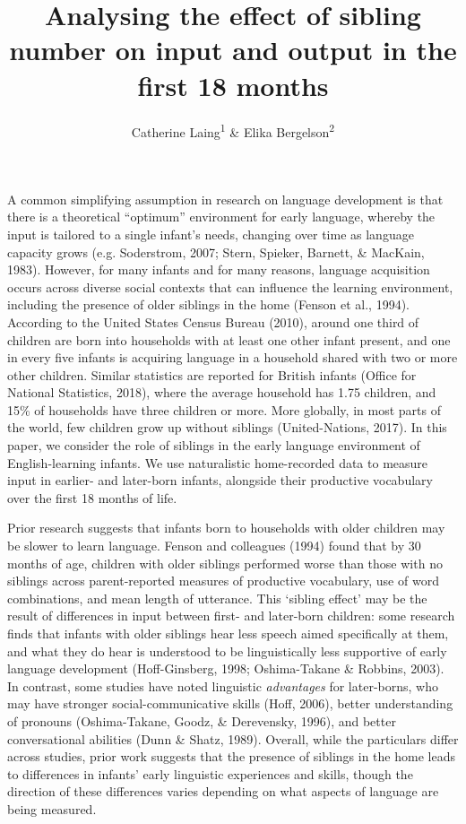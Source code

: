 \documentclass[
  man,floatsintext]{apa6}
\title{Analysing the effect of sibling number on input and output in the first 18 months}
\author{Catherine Laing\textsuperscript{1} \& Elika Bergelson\textsuperscript{2}}
\date{}
\affiliation{\vspace{0.5cm}\textsuperscript{1} University of York, York, UK\\\textsuperscript{2} Harvard University, Cambridge, MA, USA}
\begin{document}
\maketitle

A common simplifying assumption in research on language development is that there is a theoretical ``optimum'' environment for early language, whereby the input is tailored to a single infant's needs, changing over time as language capacity grows (e.g. Soderstrom, 2007; Stern, Spieker, Barnett, \& MacKain, 1983). However, for many infants and for many reasons, language acquisition occurs across diverse social contexts that can influence the learning environment, including the presence of older siblings in the home (Fenson et al., 1994). According to the United States Census Bureau (2010), around one third of children are born into households with at least one other infant present, and one in every five infants is acquiring language in a household shared with two or more other children. Similar statistics are reported for British infants (Office for National Statistics, 2018), where the average household has 1.75 children, and 15\% of households have three children or more. More globally, in most parts of the world, few children grow up without siblings (United-Nations, 2017). In this paper, we consider the role of siblings in the early language environment of English-learning infants. We use naturalistic home-recorded data to measure input in earlier- and later-born infants, alongside their productive vocabulary over the first 18 months of life.

Prior research suggests that infants born to households with older children may be slower to learn language. Fenson and colleagues (1994) found that by 30 months of age, children with older siblings performed worse than those with no siblings across parent-reported measures of productive vocabulary, use of word combinations, and mean length of utterance. This `sibling effect' may be the result of differences in input between first- and later-born children: some research finds that infants with older siblings hear less speech aimed specifically at them, and what they do hear is understood to be linguistically less supportive of early language development (Hoff-Ginsberg, 1998; Oshima-Takane \& Robbins, 2003). In contrast, some studies have noted linguistic \emph{advantages} for later-borns, who may have stronger social-communicative skills (Hoff, 2006), better understanding of pronouns (Oshima-Takane, Goodz, \& Derevensky, 1996), and better conversational abilities (Dunn \& Shatz, 1989). Overall, while the particulars differ across studies, prior work suggests that the presence of siblings in the home leads to differences in infants' early linguistic experiences and skills, though the direction of these differences varies depending on what aspects of language are being measured.
\end{document}
